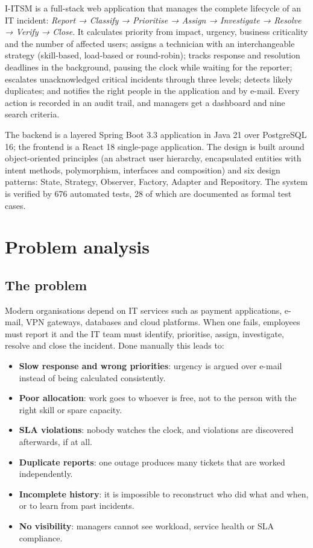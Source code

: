 \documentclass[11pt,a4paper]{article}
\begin{document}
I-ITSM is a full-stack web application that manages the complete lifecycle of an IT incident: \emph{Report → Classify → Prioritise → Assign → Investigate → Resolve → Verify → Close}. It calculates priority from impact, urgency, business criticality and the number of affected users; assigns a technician with an interchangeable strategy (skill-based, load-based or round-robin); tracks response and resolution deadlines in the background, pausing the clock while waiting for the reporter; escalates unacknowledged critical incidents through three levels; detects likely duplicates; and notifies the right people in the application and by e-mail. Every action is recorded in an audit trail, and managers get a dashboard and nine search criteria.

The backend is a layered Spring Boot 3.3 application in Java 21 over PostgreSQL 16; the frontend is a React 18 single-page application. The design is built around object-oriented principles (an abstract user hierarchy, encapsulated entities with intent methods, polymorphism, interfaces and composition) and six design patterns: State, Strategy, Observer, Factory, Adapter and Repository. The system is verified by 676 automated tests, 28 of which are documented as formal test cases.

\tableofcontents
\listoffigures
\newpage

\section{Problem analysis}
\subsection{The problem}
Modern organisations depend on IT services such as payment applications, e-mail, VPN gateways, databases and cloud platforms. When one fails, employees must report it and the IT team must identify, prioritise, assign, investigate, resolve and close the incident. Done manually this leads to:
\begin{itemize}
\item \textbf{Slow response and wrong priorities}: urgency is argued over e-mail instead of being calculated consistently.
\item \textbf{Poor allocation}: work goes to whoever is free, not to the person with the right skill or spare capacity.
\item \textbf{SLA violations}: nobody watches the clock, and violations are discovered afterwards, if at all.
\item \textbf{Duplicate reports}: one outage produces many tickets that are worked independently.
\item \textbf{Incomplete history}: it is impossible to reconstruct who did what and when, or to learn from past incidents.
\item \textbf{No visibility}: managers cannot see workload, service health or SLA compliance.
\end{itemize}
\end{document}
